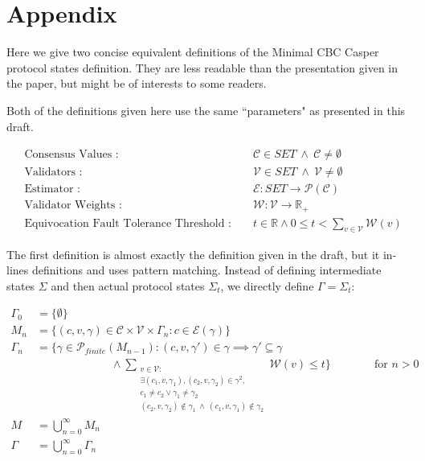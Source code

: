 \section{Appendix}

Here we give two concise equivalent definitions of the Minimal CBC Casper protocol states definition. They are less readable than the presentation given in the paper, but might be of interests to some readers.

Both of the definitions given here use the same ``parameters" as presented in this draft.

\begin{align}
&\text{Consensus Values :   } && \mathcal{C} \in SET ~ \land ~ \mathcal{C} \neq \emptyset \\
&\text{Validators :   } && \mathcal{V} \in SET ~ \land ~ \mathcal{V} \neq \emptyset\\
&\text{Estimator :   } &&\mathcal{E}: SET \to \mathcal{P}(\mathcal{C}) \\
&\text{Validator Weights :   } &&\mathcal{W}: \mathcal{V} \to \mathbb{R}_+ \\
&\text{Equivocation Fault Tolerance Threshold :   } && t \in \mathbb{R} \land 0 \leq t < \sum_{v \in \mathcal{V}} \mathcal{W}(v)
\end{align}

The first definition is almost exactly the definition given in the draft, but it in-lines definitions and uses pattern matching. Instead of defining intermediate states $\Sigma$ and then actual protocol states $\Sigma_t$, we directly define $\Gamma = \Sigma_t$:

\begin{align}
\Gamma_0 &= \{\emptyset\} \\
M_n &= \{ (c, v, \gamma) \in \mathcal{C} \times \mathcal{V} \times \Gamma_{n} : c \in \mathcal{E}(\gamma) \} \\
\Gamma_n &= \{ \gamma \in \mathcal{P}_{finite}(M_{n-1}) : (c, v, \gamma') \in \gamma \implies \gamma' \subseteq \gamma \\
&~~~~~~~~~~~~~~~~~~~~~~~~~~~~~~\land \sum_{ \substack{v \in \mathcal{V} :  \\ \exists (c_1 , v, \gamma_1), (c_2 , v, \gamma_2) \in \gamma^2, \\ c_1 \neq c_2 \lor \gamma_1 \neq \gamma_2 \\  (c_2 , v, \gamma_2) \notin \gamma_1 ~\land ~ (c_1 , v, \gamma_1) \notin \gamma_2}} \mathcal{W}(v) \leq t \}  ~~~~~~~~~~~~~~~~\text{ for $n > 0$}  \\
M &= \bigcup_{n = 0}^\infty M_n \\
\Gamma &= \bigcup_{n = 0}^\infty \Gamma_n  \\
\end{align}

